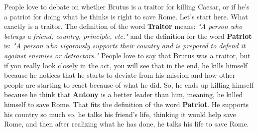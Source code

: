 People love to debate on whether Brutus is a traitor for killing Caesar, or
if he's a patriot for doing what he thinks is right to save Rome. Let's start
here. What exactly is a traitor. The definition of the word \textbf{Traitor}
means: \textit{"A person who betrays a friend, country, principle, etc."} and
the definition for the word \textbf{Patriot} is:
\textit{"A person who vigorously supports their country and is prepared to
  defend it against enemies or detractors."}
People love to say that Brutus was a traitor, but if you really look closely in
the act, you will see that in the end, he kills himself because he notices that
he starts to deviate from his mission and how other people are starting to react
because of what he did. So, he ends up killing himself because he think that
\textbf{Antony} is a better leader than him, meaning, he killed himself to save
Rome. That fits the definition of the word \textbf{Patriot}. He supports his
country so much so, he talks his friend's life, thinking it would help save
Rome, and then after realizing what he has done, he talks his life to save Rome.
